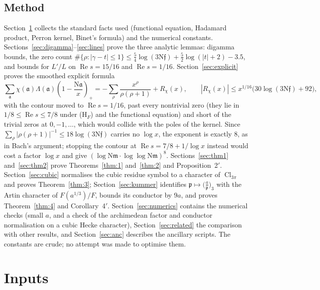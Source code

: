 \documentclass[11pt]{article}
\theoremstyle{definition}
\theoremstyle{remark}
\numberwithin{equation}{section}
\newcommand{\fa}{\mathfrak a}
\newcommand{\fp}{\mathfrak p}
\newcommand{\fm}{\mathfrak m}
\newcommand{\ff}{\mathfrak f}
\newcommand{\Nm}{\mathrm N}
\newcommand{\Cl}{\operatorname{Cl}}
\newcommand{\Rea}{\operatorname{Re}}
\newcommand{\pos}[1]{\left(#1\right)_+}
\newcommand{\cubic}[2]{\bigl(\tfrac{#1}{#2}\bigr)_{3}}
\newcommand{\HF}{\textup{(H$_F$)}}
\begin{document}
\subsection*{Method}
Section~\ref{sec:inputs} collects the standard facts used (functional equation, Hadamard product, Perron kernel, Binet's formula) and the numerical constants. Sections~\ref{sec:digamma}--\ref{sec:lines} prove the three analytic lemmas: digamma bounds, the zero count $\#\{\rho:|\gamma-t|\le1\}\le\tfrac54\log(3\Nm\ff)+\tfrac52\log(|t|+2)-3.5$, and bounds for $L'/L$ on $\Rea s=15/16$ and $\Rea s=1/16$. Section~\ref{sec:explicit} proves the smoothed explicit formula
\[
 \sum_\fa\chi(\fa)\Lambda(\fa)\pos{1-\frac{\Nm\fa}{x}}=-\sum_\rho\frac{x^\rho}{\rho(\rho+1)}+R_\chi(x),\qquad|R_\chi(x)|\le x^{1/16}\bigl(30\log(3\Nm\ff)+92\bigr),
\]
with the contour moved to $\Rea s=1/16$, past every nontrivial zero (they lie in $1/8\le\Rea s\le7/8$ under \HF{} and the functional equation) and short of the trivial zeros at $0,-1,\ldots$, which would collide with the poles of the kernel. Since $\sum_\rho|\rho(\rho+1)|^{-1}\le18\log(3\Nm\ff)$ carries no $\log x$, the exponent is exactly $8$, as in Bach's argument; stopping the contour at $\Rea s=7/8+1/\log x$ instead would cost a factor $\log x$ and give $(\log\Nm\fm\cdot\log\log\Nm\fm)^8$. Sections~\ref{sec:thm1} and~\ref{sec:thm2} prove Theorems~\ref{thm:1} and~\ref{thm:2} and Proposition~2$'$. Section~\ref{sec:cubic} normalises the cubic residue symbol to a character of $\Cl_{3\pi}$ and proves Theorem~\ref{thm:3}; Section~\ref{sec:kummer} identifies $\fp\mapsto\cubic{a}{\fp}$ with the Artin character of $F(a^{1/3})/F$, bounds its conductor by $9a$, and proves Theorem~\ref{thm:4} and Corollary~4$'$. Section~\ref{sec:numerics} contains the numerical checks (small $a$, and a check of the archimedean factor and conductor normalisation on a cubic Hecke character), Section~\ref{sec:related} the comparison with other results, and Section~\ref{sec:anc} describes the ancillary scripts. The constants are crude; no attempt was made to optimise them.

\section{Inputs}\label{sec:inputs}
\end{document}
